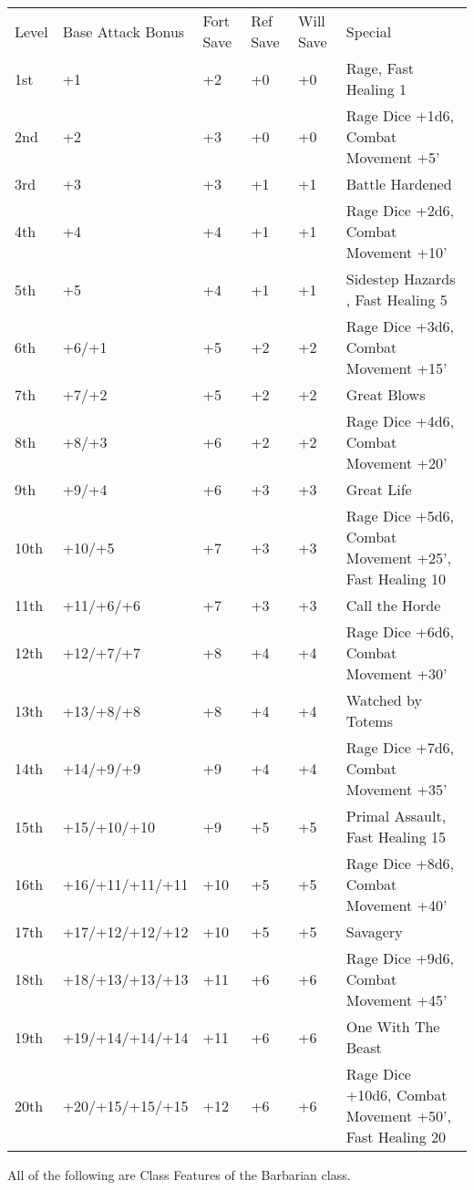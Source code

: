\begin{table}[htb]
\begin{small}
\begin{tabular}{lp{3cm}p{0.7cm}p{0.7cm}p{0.7cm}l}
Level  &Base Attack Bonus &Fort Save &Ref Save &Will Save &Special\\
1st &+1 &+2 &+0 &+0 &Rage, Fast Healing 1\\
2nd &+2 &+3 &+0 &+0 &Rage Dice +1d6, Combat Movement +5'\\
3rd &+3 &+3 &+1 &+1 &Battle Hardened\\
4th &+4 &+4 &+1 &+1 &Rage Dice +2d6, Combat Movement +10'\\
5th &+5 &+4 &+1 &+1 &Sidestep Hazards , Fast Healing 5\\
6th &+6/+1 &+5 &+2 &+2 &Rage Dice +3d6, Combat Movement +15'\\
7th &+7/+2 &+5 &+2 &+2 &Great Blows\\
8th &+8/+3 &+6 &+2 &+2 &Rage Dice +4d6, Combat Movement +20'\\
9th &+9/+4 &+6 &+3 &+3 &Great Life\\
10th &+10/+5 &+7 &+3 &+3 &Rage Dice +5d6, Combat Movement +25', Fast Healing 10\\
11th &+11/+6/+6 &+7 &+3 &+3 &Call the Horde\\
12th &+12/+7/+7 &+8 &+4 &+4 &Rage Dice +6d6, Combat Movement +30'\\
13th &+13/+8/+8 &+8 &+4 &+4 &Watched by Totems\\
14th &+14/+9/+9 &+9 &+4 &+4 &Rage Dice +7d6, Combat Movement +35'\\
15th &+15/+10/+10 &+9 &+5 &+5 &Primal Assault, Fast Healing 15\\
16th &+16/+11/+11/+11 &+10 &+5 &+5 &Rage Dice +8d6, Combat Movement +40'\\
17th &+17/+12/+12/+12 &+10 &+5 &+5 &Savagery\\
18th &+18/+13/+13/+13 &+11 &+6 &+6 &Rage Dice +9d6, Combat Movement +45'\\
19th &+19/+14/+14/+14 &+11 &+6 &+6 &One With The Beast\\
20th &+20/+15/+15/+15 &+12 &+6 &+6 &Rage Dice +10d6, Combat Movement +50', Fast Healing 20\\
\end{tabular}
\end{small}
\end{table}

\smallskip\noindent All of the following are Class Features of the Barbarian class.

